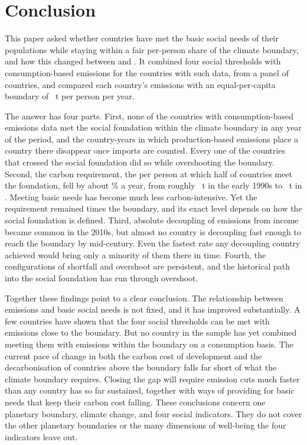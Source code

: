 \section{Conclusion}\label{sec:conclusion}

This paper asked whether countries have met the basic social needs of their populations while staying within a fair per-person share of the climate boundary, and how this changed between \nFirstYear{} and \nLastYear. It combined four social thresholds with consumption-based \COtwo{} emissions for the \nNCons{} countries with such data, from a panel of \nNCountries{} countries, and compared each country's emissions with an equal-per-capita boundary of \nBoundary~t per person per year.

The answer has four parts. First, none of the \nNCons{} countries with consumption-based emissions data met the social foundation within the climate boundary in any year of the period, and the \nProdSafeYearsAll{} country-years in which production-based emissions place a country there disappear once imports are counted. Every one of the \nNCrossers{} countries that crossed the social foundation did so while overshooting the boundary. Second, the carbon requirement, the \COtwo{} per person at which half of countries meet the foundation, fell by about \nReqTrend\% a year, from roughly \nReqStart~t in the early 1990s to \nReqEnd~t in \nLastYear{}. Meeting basic needs has become much less carbon-intensive. Yet the requirement remained \nReqEndMultiple{} times the boundary, and its exact level depends on how the social foundation is defined. Third, absolute decoupling of emissions from income became common in the 2010s, but almost no country is decoupling fast enough to reach the boundary by mid-century. Even the fastest rate any decoupling country achieved would bring only a minority of them there in time. Fourth, the configurations of shortfall and overshoot are persistent, and the historical path into the social foundation has run through overshoot.

Together these findings point to a clear conclusion. The relationship between emissions and basic social needs is not fixed, and it has improved substantially. A few countries have shown that the four social thresholds can be met with emissions close to the boundary. But no country in the sample has yet combined meeting them with emissions within the boundary on a consumption basis. The current pace of change in both the carbon cost of development and the decarbonisation of countries above the boundary falls far short of what the climate boundary requires. Closing the gap will require emission cuts much faster than any country has so far sustained, together with ways of providing for basic needs that keep their carbon cost falling. These conclusions concern one planetary boundary, climate change, and four social indicators. They do not cover the other planetary boundaries or the many dimensions of well-being the four indicators leave out.

